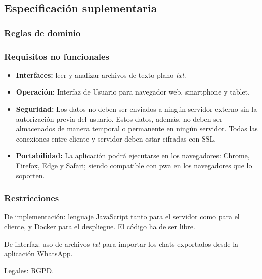 \subsection{Especificación suplementaria}
\label{subsect:suplementary-specification}

\subsubsection{Reglas de dominio}



\subsubsection{Requisitos no funcionales}

\begin{itemize}
	\item \textbf{Interfaces:} leer y analizar archivos de texto plano \textit{txt}. 
	
	\item \textbf{Operación:} Interfaz de Usuario para navegador web, smartphone y tablet.
	
	\item \textbf{Seguridad:} Los datos no deben ser enviados a ningún servidor externo sin la autorización previa del usuario. Estos datos, además, no deben ser almacenados de manera temporal o permanente en ningún servidor. Todas las conexiones entre cliente y servidor deben estar cifradas con SSL.
	
	\item \textbf{Portabilidad:} La aplicación podrá ejecutarse en los navegadores: Chrome, Firefox, Edge y Safari; siendo compatible con \acrshort{pwa} en los navegadores que lo soporten.
\end{itemize}

\subsubsection{Restricciones}
De implementación: lenguaje JavaScript tanto para el servidor como para el cliente, y Docker para el despliegue. El código ha de ser libre.

De interfaz: uso de archivos \textit{txt} para importar los chats exportados desde la aplicación WhatsApp. 

Legales: RGPD.













